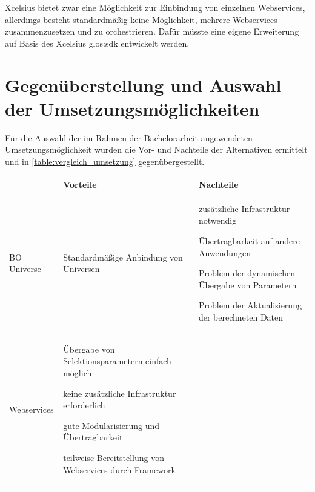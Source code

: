 \begin{onehalfspacing}
\gls{Xcelsius} bietet zwar eine Möglichkeit zur Einbindung von einzelnen Webservices, allerdings besteht standardmäßig keine Möglichkeit, mehrere Webservices zusammenzusetzen und zu orchestrieren. Dafür müsste eine eigene Erweiterung auf Basis des \gls{Xcelsius} \gls{glos:sdk} entwickelt werden.

\section{Gegenüberstellung und Auswahl der Umsetzungsmöglichkeiten}

Für die Auswahl der im Rahmen der Bachelorarbeit angewendeten Umsetzungsmöglichkeit wurden die Vor- und Nachteile der Alternativen ermittelt und in \vref{table:vergleich_umsetzung} gegenübergestellt.

{
\setlength{\extrarowheight}{2pt}
\begin{table}[htbp]
\centering
\begin{tabular}{| l | >{\centering\arraybackslash} m{5cm} | >{\centering\arraybackslash} m{5cm} |}
\cline{2-3}
\multicolumn{1}{l|}{}	& Vorteile & Nachteile \\	\hline
BO Universe 				&


\begin{seList}
\item Standardmäßige Anbindung von Universen
\end{seList}

&


\begin{seList}
\item zusätzliche Infrastruktur notwendig
\item Übertragbarkeit auf andere Anwendungen
\item Problem der dynamischen Übergabe von Parametern
\item Problem der Aktualisierung der berechneten Daten
\end{seList}


\\	\hline
Webservices 			& 

\begin{seList}
\item Übergabe von Selektionsparametern einfach möglich
\item keine zusätzliche Infrastruktur erforderlich
\item gute Modularisierung und Übertragbarkeit
\item teilweise Bereitstellung von Webservices durch Framework
\end{seList}


\end{tabular}
\end{table}}
\end{onehalfspacing}
